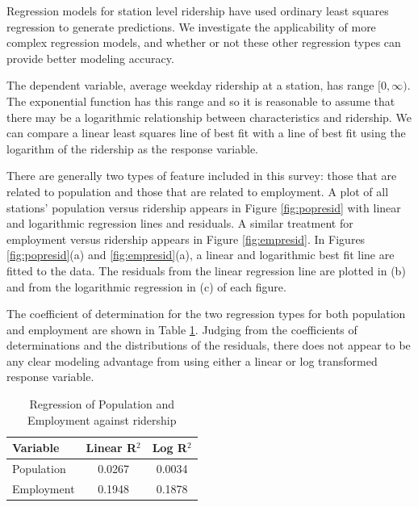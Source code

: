 \documentclass[11pt]{article}
\begin{document}
Regression models for station level ridership have used ordinary least squares regression \cite{Kuby2004, Taylor2008, Currie2011, Durning2015, Gutierrez2011} to generate predictions. We investigate the applicability of more complex regression models, and whether or not these other regression types can provide better modeling accuracy.

The dependent variable, average weekday ridership at a station, has range $[0, \infty)$. The exponential function has this range and so it is reasonable to assume that there may be a logarithmic relationship between characteristics and ridership. We can compare a linear least squares line of best fit with a line of best fit using the logarithm of the ridership as the response variable. 

There are generally two types of feature included in this survey: those that are related to population and those that are related to employment. A plot of all stations' population versus ridership appears in Figure \ref{fig:popresid} with linear and logarithmic regression lines and residuals. A similar treatment for employment versus ridership appears in Figure \ref{fig:empresid}. In Figures  \ref{fig:popresid}(a) and \ref{fig:empresid}(a), a linear and logarithmic best fit line are fitted to the data. The residuals from the linear regression line are plotted in (b) and from the logarithmic regression in (c) of each figure. 

The coefficient of determination for the two regression types for both population and employment are shown in Table \ref{tab:regr2}. Judging from the coefficients of determinations and the distributions of the residuals, there does not appear to be any clear modeling advantage from using either a linear or log transformed response variable.

\begin{table}[H]
\centering
\begin{tabular}{lcc}
\toprule Variable&Linear R$^2$&Log R$^2$ \\ 
\midrule Population&0.0267&0.0034 \\
Employment&0.1948&0.1878 \\
\bottomrule
\end{tabular}
\caption{Regression of Population and Employment against ridership}\label{tab:regr2}
\end{table}
\end{document}
